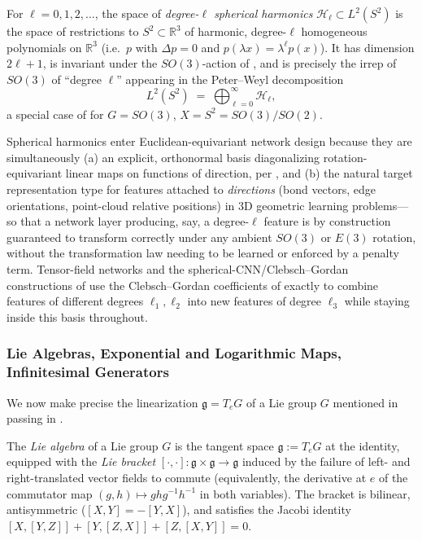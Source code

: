 \documentclass[mathematics,review,submit,moreauthors]{Definitions/mdpi}
\begin{document}
\begin{Definition}
\label{def:spherical-harmonics}
For $\ell = 0, 1, 2, \dots$, the space of \emph{degree-$\ell$ spherical
harmonics} $\mathcal{H}_\ell \subset L^2(S^2)$ is the space of restrictions
to $S^2 \subset \mathbb{R}^3$ of harmonic, degree-$\ell$ homogeneous
polynomials on $\mathbb{R}^3$ (i.e.\ $p$ with $\Delta p = 0$ and
$p(\lambda x) = \lambda^\ell p(x)$). It has dimension $2\ell+1$, is invariant
under the $SO(3)$-action of , and is
precisely the irrep of $SO(3)$ of ``degree $\ell$'' appearing in the
Peter--Weyl decomposition
\[
    L^2(S^2) \;=\; \bigoplus_{\ell = 0}^{\infty} \mathcal{H}_\ell,
\]
a special case of  for
$G = SO(3)$, $X = S^2 = SO(3)/SO(2)$.
\end{Definition}

Spherical harmonics enter Euclidean-equivariant network design because they
are simultaneously (a) an explicit, orthonormal basis diagonalizing
rotation-equivariant linear maps on functions of direction, per
, and (b) the natural target
representation type for features attached to \emph{directions} (bond
vectors, edge orientations, point-cloud relative positions) in 3D geometric
learning problems---so that a network layer producing, say, a degree-$\ell$
feature is by construction guaranteed to transform correctly under any
ambient $SO(3)$ or $E(3)$ rotation, without the transformation law needing
to be learned or enforced by a penalty term. Tensor-field networks and the
spherical-CNN/Clebsch--Gordan constructions of \citet{kondor2018p3icml} use
the Clebsch--Gordan coefficients of  exactly
to combine features of different degrees $\ell_1, \ell_2$ into new features
of degree $\ell_3$ while staying inside this basis throughout.

\subsubsection{Lie Algebras, Exponential and Logarithmic Maps, Infinitesimal Generators}
\label{subsec:lie-algebras}

We now make precise the linearization $\mathfrak{g} = T_eG$ of a Lie group
$G$ mentioned in passing in .

\begin{Definition}
\label{def:lie-algebra}
The \emph{Lie algebra} of a Lie group $G$ is the tangent space
$\mathfrak{g} := T_e G$ at the identity, equipped with the \emph{Lie
bracket} $[\cdot,\cdot] : \mathfrak{g} \times \mathfrak{g} \to \mathfrak{g}$
induced by the failure of left- and right-translated vector fields to
commute (equivalently, the derivative at $e$ of the commutator map
$(g,h) \mapsto ghg^{-1}h^{-1}$ in both variables). The bracket is bilinear,
antisymmetric ($[X,Y] = -[Y,X]$), and satisfies the Jacobi identity
$[X,[Y,Z]] + [Y,[Z,X]] + [Z,[X,Y]] = 0$.
\end{Definition}
\end{document}
